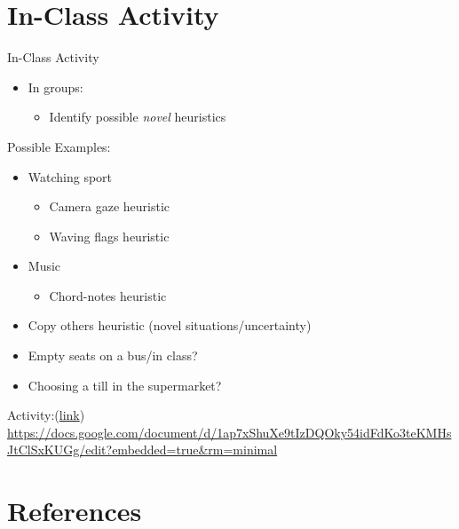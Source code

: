 \documentclass[
  ignorenonframetext,
]{beamer}
\providecommand{\tightlist}{%
  \setlength{\itemsep}{0pt}\setlength{\parskip}{0pt}}\usepackage{longtable,booktabs,array}
\begin{document}
\hypertarget{in-class-activity}{%
\section{In-Class Activity}\label{in-class-activity}}

\begin{frame}{In-Class Activity}
\protect\hypertarget{in-class-activity-1}{}
\begin{itemize}
\tightlist
\item
  In groups:

  \begin{itemize}
  \tightlist
  \item
    Identify possible \emph{novel} heuristics
  \end{itemize}
\end{itemize}

\pause

Possible Examples:

\begin{itemize}
\item
  Watching sport

  \begin{itemize}
  \tightlist
  \item
    Camera gaze heuristic
  \item
    Waving flags heuristic
  \end{itemize}
\item
  Music

  \begin{itemize}
  \tightlist
  \item
    Chord-notes heuristic
  \end{itemize}
\item
  Copy others heuristic (novel situations/uncertainty)
\item
  Empty seats on a bus/in class?
\item
  Choosing a till in the supermarket?
\end{itemize}
\end{frame}

\begin{frame}{Activity:(\href{https://docs.google.com/document/d/1ap7xShuXe9tIzDQOky54idFdKo3teKMHsJtClSxKUGg/edit?usp=sharing}{link})}
\protect\hypertarget{activitylink}{}
\url{https://docs.google.com/document/d/1ap7xShuXe9tIzDQOky54idFdKo3teKMHsJtClSxKUGg/edit?embedded=true\&rm=minimal}
\end{frame}

\hypertarget{references}{%
\section{References}\label{references}}
\end{document}

